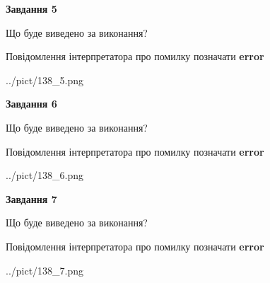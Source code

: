 \documentclass[10pt, ukrainian]{article}
\begin{document}
{\begin {large}
{\begin {center}\textbf{Завдання 5}\end {center}}\par
Що буде виведено за виконання? \par
Повідомлення інтерпретатора про помилку позначати \textbf{error}

\begin{center}
	{../pict/138_5.png}
\end{center}
\newpage

{\begin {center}\textbf{Завдання 6}\end {center}}\par
Що буде виведено за виконання? \par
Повідомлення інтерпретатора про помилку позначати \textbf{error}

\begin{center}
	{../pict/138_6.png}
\end{center}
\newpage

{\begin {center}\textbf{Завдання 7}\end {center}}\par
Що буде виведено за виконання? \par
Повідомлення інтерпретатора про помилку позначати \textbf{error}

\begin{center}
	{../pict/138_7.png}
\end{center}
\newpage

\end {large}}
\end{document}
